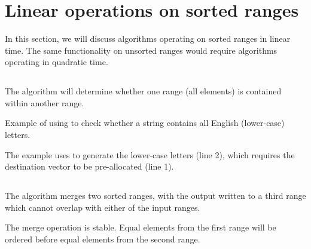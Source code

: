 \section{Linear operations on sorted ranges}

In this section, we will discuss algorithms operating on sorted ranges in linear time. The same functionality on unsorted ranges would require algorithms operating in quadratic time.

\subsection{\texorpdfstring{}{\texttt{std::includes}}}

The  algorithm will determine whether one range (all elements) is contained within another range.


\begin{box-note}
\footnotesize Example of using  to check whether a string contains all English (lower-case) letters.
\tcblower
{}
\end{box-note}

The example uses  to generate the lower-case letters (line 2), which requires the destination vector to be pre-allocated (line 1).

\subsection{\texorpdfstring{}{\texttt{std::merge}}}

The  algorithm merges two sorted ranges, with the output written to a third range which cannot overlap with either of the input ranges.


The merge operation is stable. Equal elements from the first range will be ordered before equal elements from the second range.


